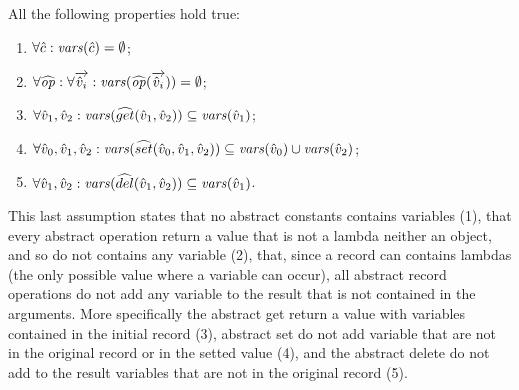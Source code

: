 \begin{assumption}[Variables]
\label{asm:variables}
All the following properties hold true:
\begin{enumerate}
\item $\forall \hat{c}: \mathit{vars}(\hat{c}) = \emptyset$;
\item $\forall \widehat{\mathit{op}}: \forall \overrightarrow{\hat{v}_i}: \mathit{vars}(\widehat{\mathit{op}}(\overrightarrow{\hat{v}_i})) = \emptyset$;
\item $\forall \hat{v}_1,\hat{v}_2: \mathit{vars}(\widehat{get}(\hat{v}_1,\hat{v}_2)) \subseteq \mathit{vars}(\hat{v}_1)$;
\item $\forall \hat{v}_0,\hat{v}_1,\hat{v}_2: \mathit{vars}(\widehat{set}(\hat{v}_0,\hat{v}_1,\hat{v}_2)) \subseteq \mathit{vars}(\hat{v}_0) \cup \mathit{vars}(\hat{v}_2)$;
\item $\forall \hat{v}_1,\hat{v}_2: \mathit{vars}(\widehat{del}(\hat{v}_1,\hat{v}_2)) \subseteq \mathit{vars}(\hat{v}_1)$.
\end{enumerate}
\end{assumption}
This last assumption states that no abstract constants contains variables (1), that every abstract operation return a value that is not a lambda neither an object, and so do not contains any variable (2), that, since a record can contains lambdas (the only possible value where a variable can occur), all abstract record operations do not add any variable to the result that is not contained in the arguments. More specifically the abstract get return a value with variables contained in the initial record (3), abstract set do not add variable that are not in the original record or in the setted value (4), and the abstract delete do not add to the result variables that are not in the original record (5).
